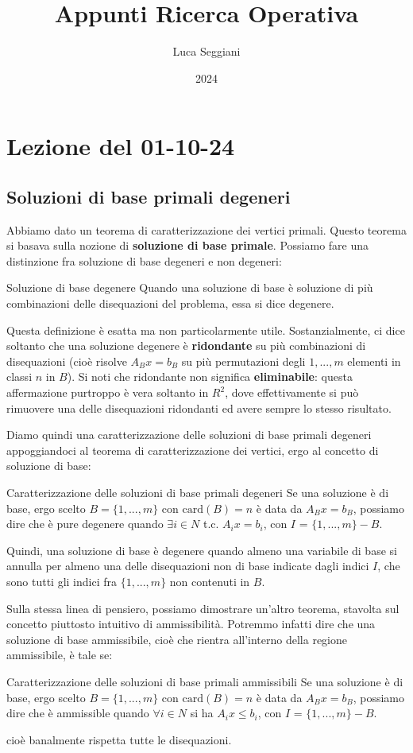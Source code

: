 \documentclass[a4paper,11pt]{article}
\title{Appunti Ricerca Operativa}
\author{Luca Seggiani}
\date{2024}
\begin{document}
\section{Lezione del 01-10-24}

\thispagestyle{empty}
\pagestyle{fancy}

\subsection{Soluzioni di base primali degeneri}
Abbiamo dato un teorema di caratterizzazione dei vertici primali.
Questo teorema si basava sulla nozione di \textbf{soluzione di base primale}.
Possiamo fare una distinzione fra soluzione di base degeneri e non degeneri:
\begin{definition}{Soluzione di base degenere}
Quando una soluzione di base è soluzione di più combinazioni delle disequazioni del problema, essa si dice degenere.
\end{definition}

Questa definizione è esatta ma non particolarmente utile.
Sostanzialmente, ci dice soltanto che una soluzione degenere è \textbf{ridondante} su più combinazioni di disequazioni (cioè risolve $A_Bx = b_B$ su più permutazioni degli $1,...,m$ elementi in classi $n$ in $B$).
Si noti che ridondante non significa \textbf{eliminabile}: questa affermazione purtroppo è vera soltanto in $R^2$, dove effettivamente si può rimuovere una delle disequazioni ridondanti ed avere sempre lo stesso risultato.

Diamo quindi una caratterizzazione delle soluzioni di base primali degeneri appoggiandoci al teorema di caratterizzazione dei vertici, ergo al concetto di soluzione di base:
\begin{theorem}{Caratterizzazione delle soluzioni di base primali degeneri}
	Se una soluzione è di base, ergo scelto $B = \{ 1, ..., m \}$ con $\mathrm{card}(B) = n$ è data da $A_Bx = b_B$, possiamo dire che è pure degenere quando $\exists i \in N$ t.c. $A_i x = b_i$, con $I$ = $\{1, ..., m\} - B$. 
\end{theorem}
Quindi, una soluzione di base è degenere quando almeno una variabile di base si annulla per almeno una delle disequazioni non di base indicate dagli indici $I$, che sono tutti gli indici fra $\{1,...,m\}$ non contenuti in $B$. 

Sulla stessa linea di pensiero, possiamo dimostrare un'altro teorema, stavolta sul concetto piuttosto intuitivo di ammissibilità.
Potremmo infatti dire che una soluzione di base ammissibile, cioè che rientra all'interno della regione ammissibile, è tale se:
\begin{theorem}{Caratterizzazione delle soluzioni di base primali ammissibili}
	Se una soluzione è di base, ergo scelto $B = \{ 1, ..., m \}$ con $\mathrm{card}(B) = n$ è data da $A_Bx = b_B$, possiamo dire che è ammissible quando $\forall i \in N$ si ha $A_i x \leq b_i$, con $I$ = $\{1, ..., m\} - B$. 
\end{theorem}
cioè banalmente rispetta tutte le disequazioni.
\end{document}
